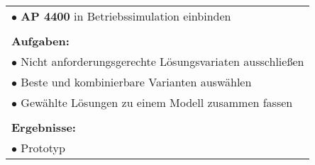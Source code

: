 \begin{table}[!h]
\begin{center}
\begin{tabular}{|p{35mm}||p{55mm}|p{50mm}||p{40mm}|}
			\multicolumn{4}{|p{150mm}|}{$\bullet$ \textbf{AP 4400} in Betriebssimulation einbinden}\\
			\multicolumn{4}{|p{150mm}|}{}\\
			\multicolumn{4}{|p{150mm}|}{\textbf{Aufgaben:}}\\
			\multicolumn{4}{|p{150mm}|}{$\bullet$ Nicht anforderungsgerechte Lösungsvariaten ausschließen}\\
			\multicolumn{4}{|p{150mm}|}{$\bullet$ Beste und kombinierbare Varianten auswählen}\\
			\multicolumn{4}{|p{150mm}|}{$\bullet$ Gewählte Lösungen zu einem Modell zusammen fassen}\\
			\multicolumn{4}{|p{150mm}|}{}\\
			\multicolumn{4}{|p{150mm}|}{\textbf{Ergebnisse:}}\\
			\multicolumn{4}{|p{150mm}|}{$\bullet$ Prototyp}\\
			\hline
		\end{tabular}
	\end{center}
\end{table}

